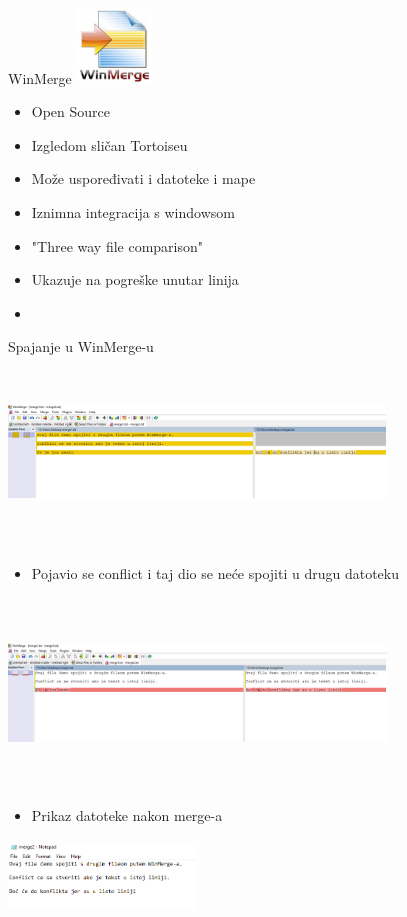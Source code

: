\documentclass[10pt]{beamer}
\begin{document}
\begin{frame}{WinMerge}
\includegraphics[width=2cm, height=2cm]{WinMerge1.png}
\begin{itemize}
    \item Open Source
    \item Izgledom sličan Tortoiseu
    \item Može uspoređivati i datoteke i mape
    \item Iznimna integracija s windowsom
    \item "Three way file comparison"
    \item Ukazuje na pogreške unutar linija
    \item \cite{winmerg}
\end{itemize}
    
\end{frame}
\begin{frame}{Spajanje u WinMerge-u}
\includegraphics[width=10cm, height=5cm]{WinMerge2.png}
    
\end{frame}
\begin{frame}
    \begin{itemize}
        \item Pojavio se conflict i taj dio se neće spojiti u drugu datoteku
    \end{itemize}
    \includegraphics[width=10cm, height=5cm]{WinMerge3.png}\newline
    \begin{itemize}
        \item Prikaz datoteke nakon merge-a
    \end{itemize}
    \includegraphics[width=5cm, height=2cm]{WinMerge4.png}
\end{frame}
\end{document}
